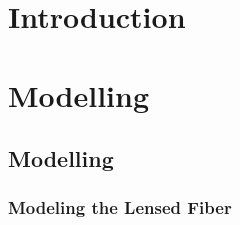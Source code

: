 
\chapter{Introduction}


%
%
%
%
%
%

\chapter{Modelling}
%
%
\section{Modelling}
%
\subsection{Modeling the Lensed Fiber}
\label{sect:model_model_model_TLF}
%
%


